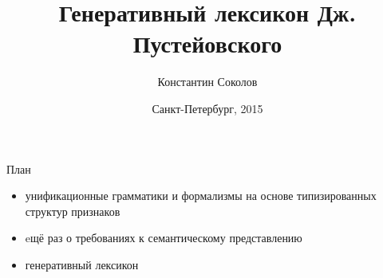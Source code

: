 \documentclass{beamer}
\begin{document}
\title{\Large{Генеративный лексикон Дж. Пустейовского}}
\author{Константин Соколов}
\date{Санкт-Петербург, 2015} 
\begin{frame}
    \thispagestyle{empty}
    \titlepage
\end{frame}

% 
%
%
\begin{frame}{План}
    \setcounter{framenumber}{1}
    \begin{itemize}
        \item унификационные грамматики и формализмы на основе типизированных структур признаков
        \item eщё раз о требованиях к семантическому представлению
        \item генеративный лексикон
    \end{itemize}
\end{frame}
\end{document}
